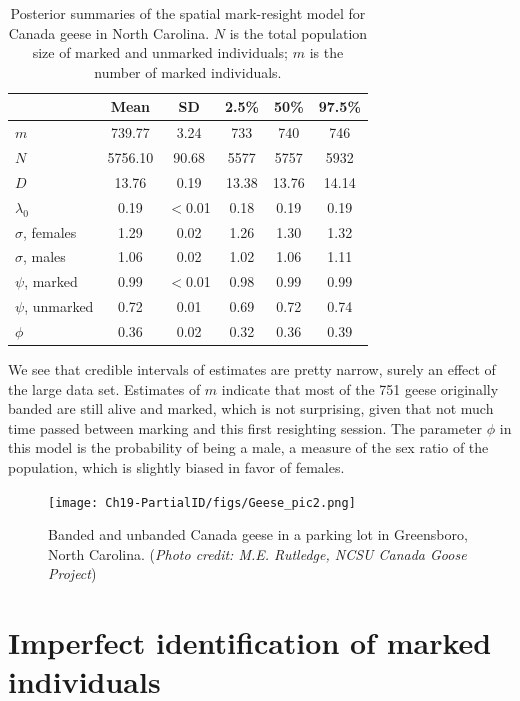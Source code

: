 \begin{table}
\label{partialID.tab.geese}
\centering
  \caption{Posterior summaries of the spatial mark-resight model for Canada geese in North Carolina. $N$ is the total population size of marked and unmarked individuals; $m$ is the number of marked individuals.}
  \begin{tabular}{lccccc}
             \hline
                  & Mean    & SD      & 2.5\% & 50\%  & 97.5\% \\
           \hline
$m$               & 739.77  & 3.24    & 733   & 740   & 746    \\
$N$               & 5756.10 & 90.68   & 5577  & 5757  & 5932   \\
$D$               & 13.76   & 0.19    & 13.38 & 13.76 & 14.14  \\
$\lambda_0$       & 0.19    & $<$0.01 & 0.18  & 0.19  & 0.19   \\
$\sigma$, females & 1.29    & 0.02    & 1.26  & 1.30  & 1.32   \\
$\sigma$, males   & 1.06    & 0.02    & 1.02  & 1.06  & 1.11   \\
$\psi$, marked    & 0.99    & $<$0.01 & 0.98  & 0.99  & 0.99   \\
$\psi$, unmarked  & 0.72    & 0.01    & 0.69  & 0.72  & 0.74   \\
$\phi$            & 0.36    & 0.02    & 0.32  & 0.36  & 0.39   \\
    \hline
  \end{tabular}
\end{table}

We see that credible intervals of estimates are pretty narrow, surely an effect of the large data set. Estimates of $m$ indicate that most of the 751 geese originally banded are still alive and marked, which is not surprising, given that not much time passed between marking and this first resighting session. The parameter $\phi$ in this model is the probability of being a male, a measure of the sex ratio of the population, which is slightly biased in favor of females.

\begin{figure}[ht]
  \centering
  \texttt{[image: Ch19-PartialID/figs/Geese\_pic2.png]}
  \caption{Banded and unbanded Canada geese in a parking lot in Greensboro, North Carolina.
({\it Photo credit: M.E. Rutledge, NCSU Canada Goose Project})}
  \label{partialID.fig.geese}
\end{figure}


\section  {Imperfect identification of marked individuals}
\label{partialID.sec.IDrate}

